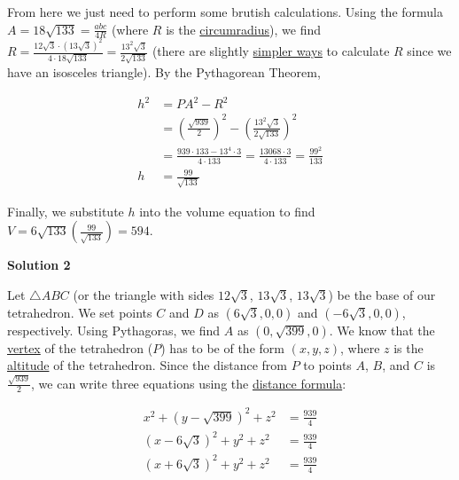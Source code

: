 \begin{enumerate}
 From here we just need to perform some brutish calculations. Using the formula $A = 18\sqrt{133} = \frac{abc}{4R}$ (where $R$ is the \href{https://artofproblemsolving.com/wiki/index.php?title=Circumradius}{circumradius}), we find $R = \frac{12\sqrt{3} \cdot (13\sqrt{3})^2}{4\cdot 18\sqrt{133}} = \frac{13^2\sqrt{3}}{2\sqrt{133}}$ (there are slightly \href{https://artofproblemsolving.com/wiki/index.php?title=Law\_of\_Sines}{simpler ways} to calculate $R$ since we have an isosceles triangle). By the Pythagorean Theorem, 

 
 \begin{align*}h^2 &= PA^2 - R^2 \\ &= \left(\frac{\sqrt{939}}{2}\right)^2 - \left(\frac{13^2\sqrt{3}}{2\sqrt{133}}\right)^2\\ &= \frac{939 \cdot 133 - 13^4 \cdot 3}{4 \cdot 133} = \frac{13068 \cdot 3}{4 \cdot 133} = \frac{99^2}{133}\\ h &= \frac{99}{\sqrt{133}} \end{align*}


 Finally, we substitute $h$ into the volume equation to find $V = 6\sqrt{133}\left(\frac{99}{\sqrt{133}}\right) = \boxed{594}$.

 



\textbf{Solution 2}

Let $\triangle{ABC}$ (or the triangle with sides $12\sqrt {3}$, $13\sqrt {3}$, $13\sqrt {3}$) be the base of our tetrahedron. We set points $C$ and $D$ as $(6\sqrt {3}, 0, 0)$ and $( - 6\sqrt {3}, 0, 0)$, respectively. Using Pythagoras, we find $A$ as $(0, \sqrt {399}, 0)$. We know that the \href{https://artofproblemsolving.com/wiki/index.php?title=Vertex}{vertex} of the tetrahedron ($P$) has to be of the form $(x, y, z)$, where $z$ is the \href{https://artofproblemsolving.com/wiki/index.php?title=Altitude}{altitude} of the tetrahedron. Since the distance from $P$ to points $A$, $B$, and $C$ is $\frac {\sqrt {939}}{2}$, we can write three equations using the \href{https://artofproblemsolving.com/wiki/index.php?title=Distance\_formula}{distance formula}:

 
 \begin{align*} x^{2} + (y - \sqrt {399})^{2} + z^{2} &= \frac {939}{4}\\ (x - 6\sqrt {3})^{2} + y^{2} + z^{2} &= \frac {939}{4}\\ (x + 6\sqrt {3})^{2} + y^{2} + z^{2} &= \frac {939}{4} \end{align*}



\end{enumerate}
